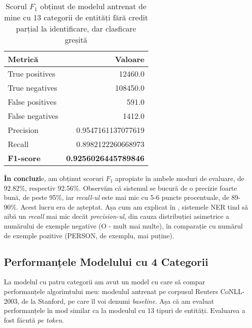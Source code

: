 \begin{center}
\begin{table}[htb]
  \caption{Scorul $F_1$ obținut de modelul antrenat de mine cu 13 categorii de entități fără credit parțial la identificare, dar clasficare greșită}
  \begin{tabular}{|l|r|}
  \hline
   Metrică & Valoare\\
   \hline
  True positives & 12460.0 \\
  True negatives & 108450.0 \\
  False positives & 591.0 \\
  False negatives & 1412.0 \\
    \hline
  Precision & 0.9547161137077619\\
  Recall & 0.8982122260668973 \\
  \hline
  \textbf{F1-score} & \textbf{0.9256026445789846} \\
   \hline
   
  \end{tabular}
  \label{table:f1-score-13-class-no-credit}
\end{table}
\end{center}


\textbf{În concluzi}e, am obținut scoruri $F_1$ apropiate în ambele moduri de evaluare, de  92.82\%, respectiv 92.56\%. Observăm că sistemul se bucură de o precizie foarte bună, de peste 95\%, iar \textit{recall-ul} este mai mic cu 5-6 puncte procentuale, de 89-90\%. Acest lucru era de așteptat. Așa cum am explicat în , sistemele NER tind să aibă un \textit{recall} mai mic decăt \textit{precision-ul}, din cauza distribuției asimetrice a numărului de exemple negative (O - mult mai multe), în comparație cu numărul de exemple pozitive (PERSON, de exemplu, mai puține). 

\subsection{Performanțele Modelului cu 4 Categorii}

La modelul cu patru categorii am avut un model cu care să compar performanțele algorimtului meu: modeulul antrenat pe corpusul Reuters CoNLL-2003, de la Stanford, pe care îl voi denumi \textit{baseline}. Așa că am evaluat performanțele în mod similar ca la modeulul cu 13 tipuri de entități. Evaluarea a fost făcută \textit{pe token}.

